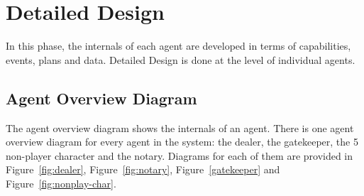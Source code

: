 \documentclass[a4paper]{article}
\begin{document}
\section{Detailed Design}\label{sec:detaildesign}

In this phase, the internals of each agent are developed in terms of capabilities, events, plans and data. Detailed Design is done at the level of individual agents.

\subsection{Agent Overview Diagram}
The agent overview diagram shows the internals of an agent. There is one agent overview diagram for every agent in the system: the dealer, the gatekeeper, the 5 non-player character and the notary. Diagrams for each of them are provided in Figure~\ref{fig:dealer}, Figure~\ref{fig:notary}, Figure~\ref{gatekeeper} and Figure~\ref{fig:nonplay-char}.
\end{document}
